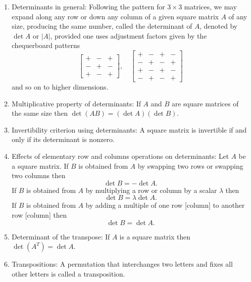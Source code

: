 \documentclass{article}
\begin{document}
\begin{enumerate}
\[\begin{array}{cc}
    g & k
    \end{array}\right|+c\left|\begin{array}{cc}
    d & e \\
    g & h
    \end{array}\right|
    \]
    called the expansion along the first row, where the smaller determinant arises by ignoring the row and column of the entry being used as a coefficient.
    \item Determinants in general: Following the pattern for $3 \times 3$ matrices, we may expand along any row or down any column of a given square matrix $A$ of any size, producing the same number, called the determinant of $A$, denoted by $\det A$ or $|A|$, provided one uses adjustment factors given by the chequerboard patterns
    \[
    \left[\begin{array}{ccc}
    + & - & + \\
    - & + & - \\
    + & - & +
    \end{array}\right], \quad\left[\begin{array}{cccc}
    + & - & + & - \\
    - & + & - & + \\
    + & - & + & - \\
    - & + & - & +
    \end{array}\right]
    \]
    and so on to higher dimensions.
    \item Multiplicative property of determinants: If $A$ and $B$ are square matrices of the same size then $\det(A B)=(\det A)(\det B)$.
    \item Invertibility criterion using determinants: A square matrix is invertible if and only if its determinant is nonzero.
    \item Effects of elementary row and columns operations on determinants: Let $A$ be a square matrix. If $B$ is obtained from $A$ by swapping two rows or swapping two columns then
    \[
    \det B=-\det A \text{.}
    \]
    If $B$ is obtained from $A$ by multiplying a row or column by a scalar $\lambda$ then
    \[
    \det B=\lambda \det A \text{.}
    \]
    If $B$ is obtained from $A$ by adding a multiple of one row [column] to another row [column] then
    \[
    \det B=\det A \text{.}
    \]
    \item Determinant of the transpose: If $A$ is a square matrix then $\det\left(A^{T}\right)=\det A$.
    \item Transpositions: A permutation that interchanges two letters and fixes all other letters is called a transposition.

\end{enumerate}
\end{document}
